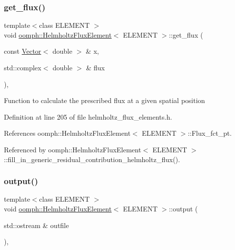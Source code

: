 \subsubsection{\texorpdfstring{get\+\_\+flux()}{get\_flux()}}
{\footnotesize\ttfamily template$<$class E\+L\+E\+M\+E\+NT $>$ \\
void \hyperlink{classoomph_1_1HelmholtzFluxElement}{oomph\+::\+Helmholtz\+Flux\+Element}$<$ E\+L\+E\+M\+E\+NT $>$\+::get\+\_\+flux (\begin{DoxyParamCaption}\item[{const \hyperlink{classoomph_1_1Vector}{Vector}$<$ double $>$ \&}]{x,  }\item[{std\+::complex$<$ double $>$ \&}]{flux }\end{DoxyParamCaption})\hspace{0.3cm}{\ttfamily [inline]}, {\ttfamily [protected]}}

Function to calculate the prescribed flux at a given spatial position 

Definition at line 205 of file helmholtz\+\_\+flux\+\_\+elements.\+h.



References oomph\+::\+Helmholtz\+Flux\+Element$<$ E\+L\+E\+M\+E\+N\+T $>$\+::\+Flux\+\_\+fct\+\_\+pt.



Referenced by oomph\+::\+Helmholtz\+Flux\+Element$<$ E\+L\+E\+M\+E\+N\+T $>$\+::fill\+\_\+in\+\_\+generic\+\_\+residual\+\_\+contribution\+\_\+helmholtz\+\_\+flux().

\mbox{\label{classoomph_1_1HelmholtzFluxElement_a08f6410ef176312d00f5a5c13caa1b06}} 
\subsubsection{\texorpdfstring{output()}{output()}\hspace{0.1cm}{\footnotesize\ttfamily [1/4]}}
{\footnotesize\ttfamily template$<$class E\+L\+E\+M\+E\+NT $>$ \\
void \hyperlink{classoomph_1_1HelmholtzFluxElement}{oomph\+::\+Helmholtz\+Flux\+Element}$<$ E\+L\+E\+M\+E\+NT $>$\+::output (\begin{DoxyParamCaption}\item[{std\+::ostream \&}]{outfile }\end{DoxyParamCaption})\hspace{0.3cm}{\ttfamily [inline]}, {\ttfamily [virtual]}}

